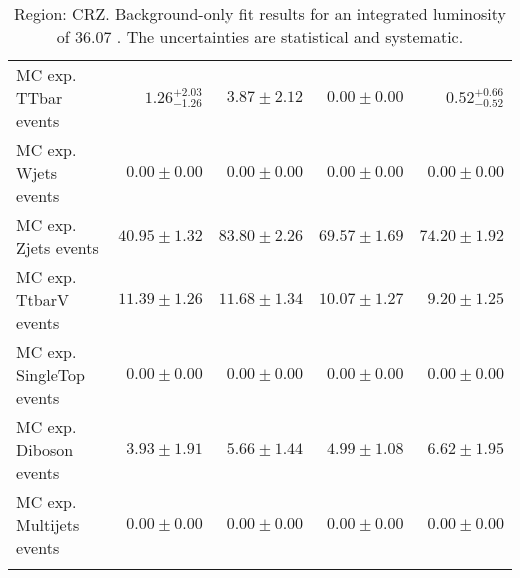 \begin{table}
\begin{center}
{\begin{tabular*}{\textwidth}{@{\extracolsep{\fill}}lrrrr}
\noalign{\smallskip}\hline\noalign{\smallskip}
        MC exp. TTbar events         & $1.26_{-1.26}^{+2.03}$          & $3.87 \pm 2.12$          & $0.00 \pm 0.00$          & $0.52_{-0.52}^{+0.66}$              \\
        MC exp. Wjets events         & $0.00 \pm 0.00$          & $0.00 \pm 0.00$          & $0.00 \pm 0.00$          & $0.00 \pm 0.00$              \\
        MC exp. Zjets events         & $40.95 \pm 1.32$          & $83.80 \pm 2.26$          & $69.57 \pm 1.69$          & $74.20 \pm 1.92$              \\
        MC exp. TtbarV events         & $11.39 \pm 1.26$          & $11.68 \pm 1.34$          & $10.07 \pm 1.27$          & $9.20 \pm 1.25$              \\
        MC exp. SingleTop events         & $0.00 \pm 0.00$          & $0.00 \pm 0.00$          & $0.00 \pm 0.00$          & $0.00 \pm 0.00$              \\
        MC exp. Diboson events         & $3.93 \pm 1.91$          & $5.66 \pm 1.44$          & $4.99 \pm 1.08$          & $6.62 \pm 1.95$              \\
        MC exp. Multijets events         & $0.00 \pm 0.00$          & $0.00 \pm 0.00$          & $0.00 \pm 0.00$          & $0.00 \pm 0.00$              \\
\noalign{\smallskip}\hline\noalign{\smallskip}
\end{tabular*}
}
\end{center}
\caption{Region: CRZ. Background-only fit results for an integrated luminosity of 36.07 \ifb. The uncertainties are statistical and systematic.
}
\label{table.bkgonly.CRZ}
\end{table}
%